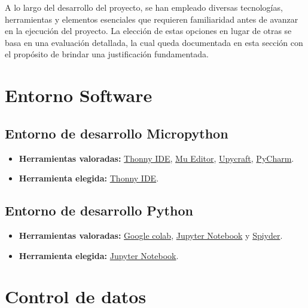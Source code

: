 
A lo largo del desarrollo del proyecto, se han empleado diversas tecnologías, herramientas y elementos esenciales que requieren familiaridad antes de avanzar en la ejecución del proyecto. La elección de estas opciones en lugar de otras se basa en una evaluación detallada, la cual queda documentada en esta sección con el propósito de brindar una justificación fundamentada.

\section{Entorno Software}
\subsection{Entorno de desarrollo Micropython}\label{4:MicroPython}
\begin{itemize}
	\item \textbf{Herramientas valoradas:} \href{https://thonny.org/}{Thonny IDE}, \href{https://codewith.mu/}{Mu Editor}, \href{https://dfrobot.gitbooks.io/upycraft/content/}{Upycraft}, \href{https://www.jetbrains.com/pycharm/}{PyCharm}.
    \item \textbf{Herramienta elegida:} \href{https://thonny.org/}{Thonny IDE}.
\end{itemize}

\subsection{Entorno de desarrollo Python}\label{4:Python}
\begin{itemize}
	\item \textbf{Herramientas valoradas:} \href{https://colab.google/}{Google colab}, \href{https://jupyter.org/}{Jupyter Notebook} y \href{https://www.spyder-ide.org/}{Spiyder}.
    \item \textbf{Herramienta elegida:} \href{https://jupyter.org/}{Jupyter Notebook}.
\end{itemize}

\section{Control de datos}
